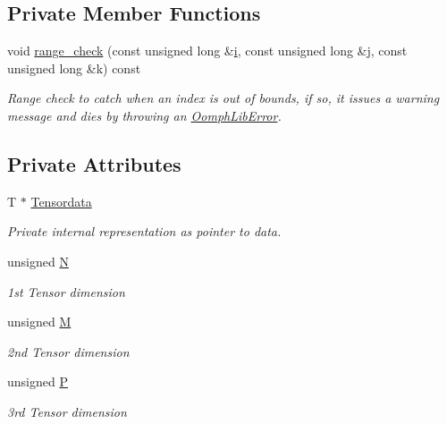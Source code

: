 \subsection*{Private Member Functions}
\begin{DoxyCompactItemize}
\item 
void \hyperlink{classoomph_1_1RankThreeTensor_a7a54cd8aaf72f4876314ed23aa9b813e}{range\+\_\+check} (const unsigned long \&\hyperlink{cfortran_8h_adb50e893b86b3e55e751a42eab3cba82}{i}, const unsigned long \&j, const unsigned long \&k) const
\begin{DoxyCompactList}\small\item\em Range check to catch when an index is out of bounds, if so, it issues a warning message and dies by throwing an {\ttfamily \hyperlink{classoomph_1_1OomphLibError}{Oomph\+Lib\+Error}}. \end{DoxyCompactList}\end{DoxyCompactItemize}
\subsection*{Private Attributes}
\begin{DoxyCompactItemize}
\item 
T $\ast$ \hyperlink{classoomph_1_1RankThreeTensor_aef2671e89361c2260c7d3936fc8860ec}{Tensordata}
\begin{DoxyCompactList}\small\item\em Private internal representation as pointer to data. \end{DoxyCompactList}\item 
unsigned \hyperlink{classoomph_1_1RankThreeTensor_a2d5b895e2cb3543b16a64159041d52c3}{N}
\begin{DoxyCompactList}\small\item\em 1st Tensor dimension \end{DoxyCompactList}\item 
unsigned \hyperlink{classoomph_1_1RankThreeTensor_a9e28da9e2862c47f2f5562742202748d}{M}
\begin{DoxyCompactList}\small\item\em 2nd Tensor dimension \end{DoxyCompactList}\item 
unsigned \hyperlink{classoomph_1_1RankThreeTensor_ae93ba8b2baf4f92af533ae66bfcbe570}{P}
\begin{DoxyCompactList}\small\item\em 3rd Tensor dimension \end{DoxyCompactList}\end{DoxyCompactItemize}


